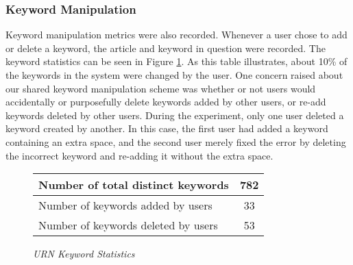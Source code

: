 \begin{figure*}[t]
  {\centerline{}}
  \caption{
  {\em A scatter plot of user \#2's voting behavior over the experimental
  period. Over time, interesting articles were more positively weighted,
  while uninteresting articles were more negatively weighted.  However, in
  the last two sessions, some articles with high negative weight were
  voted interesting, and vice versa.}}
  \label{fig:cmoore}
\end{figure*}

\begin{figure*}[t]
  {\centerline{}}
  \caption{
  {\em A scatter plot of user \#3's voting behavior over the
  experimental period. This user's weighting functions caused almost all
  articles to be weighted negatively, resulting in this plot with all
  negative values.}}
  \label{fig:dat}
\end{figure*}

\subsubsection{Keyword Manipulation}

Keyword manipulation metrics were also recorded. Whenever a user chose to
add or delete a keyword, the article and keyword in question were recorded.
The keyword statistics can be seen in Figure \ref{tab:keyword-stat}. As
this table illustrates, about 10\% of the keywords in the system were
changed by the user. One concern raised about our shared keyword
manipulation scheme was whether or not users would accidentally or
purposefully delete keywords added by other users, or re-add keywords
deleted by other users. During the experiment, only one user deleted a
keyword created by another. In this case, the first user had added a
keyword containing an extra space, and the second user merely fixed the
error by deleting the incorrect keyword and re-adding it without the extra
space.


\begin{figure}[htb]
  \begin{center}
    \small
  \begin{tabular} {|l|c|} \hline   
    Number of total distinct keywords & 782 \\ \hline
    Number of keywords added by users & 33 \\ \hline
    Number of keywords deleted by users & 53 \\ \hline
  \end{tabular}
  \caption{
  {\em URN Keyword Statistics}}
  \label{tab:keyword-stat}
  \normalsize
  \end{center}
\end{figure}


